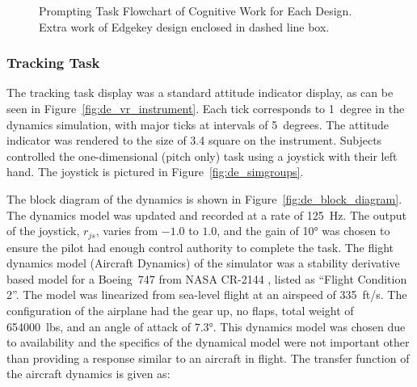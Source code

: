 \begin{figure}
    \medskip
    \caption{Prompting Task Flowchart of Cognitive Work for Each Design. Extra work of Edgekey design enclosed in dashed line box.}
    \label{fig:de_flowchart}
\end{figure}

\subsubsection{Tracking Task}
\label{sec:de_fdm}

The tracking task display was a standard attitude indicator display, as can be seen in Figure~\ref{fig:de_vr_instrument}.
Each tick corresponds to 1~degree in the dynamics simulation, with major ticks at intervals of 5~degrees.
The attitude indicator was rendered to the size of \SI{3.4}{\inch} square on the instrument.
Subjects controlled the one-dimensional (pitch only) task using a joystick with their left hand.
The joystick is pictured in Figure~\ref{fig:de_simgroups}.


The block diagram of the dynamics is shown in Figure~\ref{fig:de_block_diagram}.
The dynamics model was updated and recorded at a rate of \SI{125}{\hertz}.
The output of the joystick, $r_{js}$, varies from $-1.0$ to $1.0$, and the gain of \ang{10} was chosen to ensure the pilot had enough control authority to complete the task.
The flight dynamics model (Aircraft Dynamics) of the simulator was a stability derivative based model for a Boeing~747 from NASA CR-2144 \citep{heffley_aircraft_1972}, listed as ``Flight Condition 2''.
The model was linearized from sea-level flight at an airspeed of 335~ft/s.
The configuration of the airplane had the gear up, no flaps, total weight of \num{654000}~lbs, and an angle of attack of \ang{7.3}.
This dynamics model was chosen due to availability and the specifics of the dynamical model were not important other than providing a response similar to an aircraft in flight.
The transfer function of the aircraft dynamics is given as:

